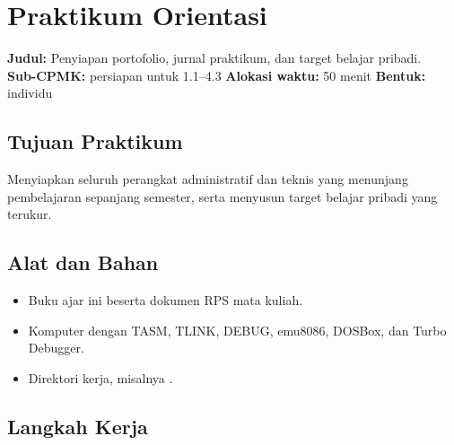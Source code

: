\section{Praktikum Orientasi}
\label{sec:praktikum-bab1}

\begin{praktikumbox}
\textbf{Judul:} Penyiapan portofolio, jurnal praktikum, dan target
belajar pribadi.\\[0.3em]
\textbf{Sub-CPMK:} persiapan untuk 1.1--4.3 \quad\textbullet\quad
\textbf{Alokasi waktu:} 50 menit \quad\textbullet\quad
\textbf{Bentuk:} individu
\end{praktikumbox}

\subsection{Tujuan Praktikum}

Menyiapkan seluruh perangkat administratif dan teknis yang
menunjang pembelajaran sepanjang semester, serta menyusun target
belajar pribadi yang terukur.

\subsection{Alat dan Bahan}

\begin{itemize}
    \item Buku ajar ini beserta dokumen RPS mata kuliah.
    \item Komputer dengan TASM, TLINK, DEBUG, emu8086, DOSBox, dan
          Turbo Debugger.
    \item Direktori kerja, misalnya .
\end{itemize}

\subsection{Langkah Kerja}

